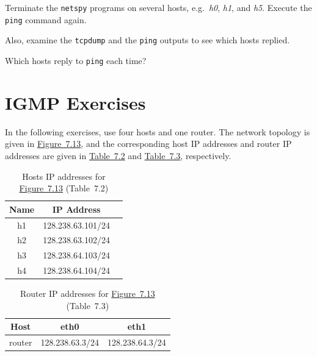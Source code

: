 \documentclass{../UTNetLab}
\begin{document}
    Terminate the \lstinline{netspy} programs on several hosts, e.g.\ \textit{h0}, \textit{h1}, and \textit{h5}.
    Execute the \lstinline{ping} command again.

    Also, examine the \lstinline{tcpdump} and the \lstinline{ping} outputs to see which hosts replied.

    \begin{report}
    \item Which hosts reply to \lstinline{ping} each time?
    \end{report}

\part{IGMP Exercises}\label{sec:igmp}
    In the following exercises, use four hosts and one router. The network topology is given in \hyperref[fig:7.13]{Figure~7.13}, and the corresponding host IP addresses and router IP addresses are given in \hyperref[tab:7.2]{Table~7.2} and \hyperref[tab:7.3]{Table~7.3}, respectively.

    \begin{table}[H]
        \caption{Hosts IP addresses for \hyperref[fig:7.13]{Figure~7.13} (Table~7.2)}
        \label{tab:7.2}
        \centering
        \begin{tabular}{ *3c }
            \hline \hline
            Name & IP Address \\
            \hline
                h1 & 128.238.63.101/24 \\
                h2 & 128.238.63.102/24 \\
                h3 & 128.238.64.103/24 \\
                h4 & 128.238.64.104/24 \\
            \hline \hline
            \end{tabular}
    \end{table}

    \begin{table}[H]
        \caption{Router IP addresses for \hyperref[fig:7.13]{Figure~7.13} (Table~7.3)}
        \label{tab:7.3}
        \centering
        \begin{tabular}{ *3c }
            \hline \hline
            Host & eth0 & eth1 \\
            \hline
            router & 128.238.63.3/24 & 128.238.64.3/24 \\
            \hline \hline
            \end{tabular}
    \end{table}
\end{document}
